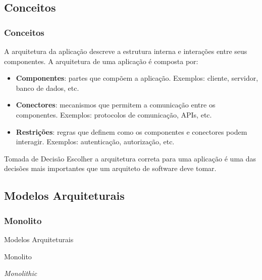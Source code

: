 \documentclass[
	10pt, %
	t, %
]{beamer}
\begin{document}

\subsection{Conceitos}

\begin{frame}
	\frametitle{Conceitos}
	
	A \alert{arquitetura da aplicação} descreve a estrutura interna e interações entre seus componentes. A arquitetura de uma aplicação é composta por:

	\begin{itemize}
		\item \textbf{Componentes}: partes que compõem a aplicação. Exemplos: cliente, servidor, banco de dados, etc.
		\item \textbf{Conectores}: mecanismos que permitem a comunicação entre os componentes. Exemplos: protocolos de comunicação, APIs, etc.
		\item \textbf{Restrições}: regras que definem como os componentes e conectores podem interagir. Exemplos: autenticação, autorização, etc.
	\end{itemize}
	\bigskip %

	\begin{alertblock}{Tomada de Decisão}
		Escolher a arquitetura correta para uma aplicação é uma das decisões mais importantes que um arquiteto de software deve tomar.
	\end{alertblock}
\end{frame}


\subsection{Modelos Arquiteturais}
\subsubsection{Monolito}

\begin{frame}
	\begin{center}
		
		\bigskip\bigskip\bigskip\bigskip %
		{\Large Modelos Arquiteturais}
		
		\bigskip\bigskip %
		{\Huge Monolito}
		
		\smallskip
		{\small \textit{Monolithic}}
	\end{center}

\end{frame}
\end{document}
